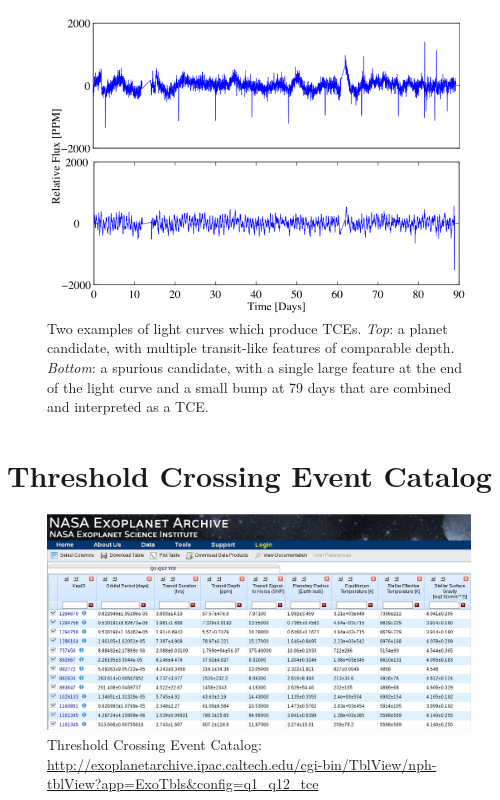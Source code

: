 \begin{figure}[!h]
\begin{center}
        \includegraphics[width=0.7\textheight]{img/TCE_lightcurves.png}
        \caption{Two examples of light curves which produce TCEs. \emph{Top}: a planet
candidate, with multiple transit-like features of comparable depth. \emph{Bottom}: a spurious candidate, with a
single large feature at the end of the light curve and a small bump at 79 days that are combined and
interpreted as a TCE.}  \label{fig:TCE_lightcurves}
\end{center}
\end{figure}


\section{Threshold Crossing Event Catalog}

\begin{figure}[!h]
\begin{center}
        \includegraphics[width=0.8\textheight]{img/TCECatalog.png}
        \caption{Threshold Crossing Event Catalog:  \url{http://exoplanetarchive.ipac.caltech.edu/cgi-bin/TblView/nph-tblView?app=ExoTbls&config=q1_q12_tce}}  \label{fig:tcecatalog}
\end{center}
\end{figure}

